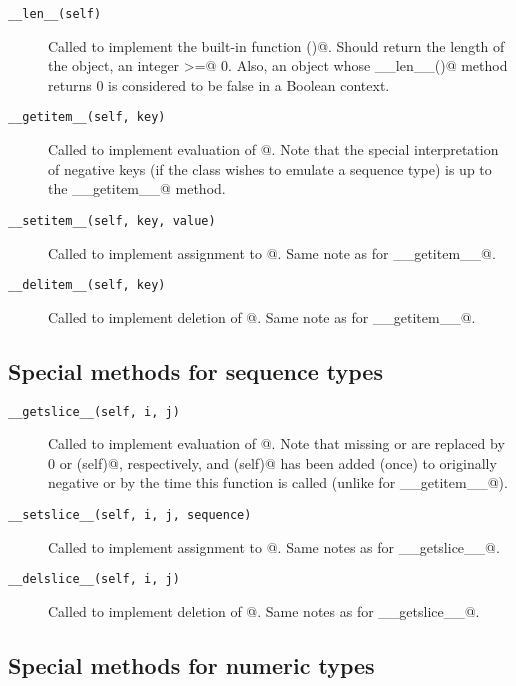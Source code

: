 \begin{description}

\item[\tt __len__(self)]
Called to implement the built-in function \verb@len()@.  Should return
the length of the object, an integer \verb@>=@ 0.  Also, an object
whose \verb@__len__()@ method returns 0 is considered to be false in a
Boolean context.

\item[\tt __getitem__(self, key)]
Called to implement evaluation of \verb@self[key]@.  Note that the
special interpretation of negative keys (if the class wishes to
emulate a sequence type) is up to the \verb@__getitem__@ method.

\item[\tt __setitem__(self, key, value)]
Called to implement assignment to \verb@self[key]@.  Same note as for
\verb@__getitem__@.

\item[\tt __delitem__(self, key)]
Called to implement deletion of \verb@self[key]@.  Same note as for
\verb@__getitem__@.

\end{description}


\subsection{Special methods for sequence types}

\begin{description}

\item[\tt __getslice__(self, i, j)]
Called to implement evaluation of \verb@self[i:j]@.  Note that missing
\verb@i@ or \verb@j@ are replaced by 0 or \verb@len(self)@,
respectively, and \verb@len(self)@ has been added (once) to originally
negative \verb@i@ or \verb@j@ by the time this function is called
(unlike for \verb@__getitem__@).

\item[\tt __setslice__(self, i, j, sequence)]
Called to implement assignment to \verb@self[i:j]@.  Same notes as for
\verb@__getslice__@.

\item[\tt __delslice__(self, i, j)]
Called to implement deletion of \verb@self[i:j]@.  Same notes as for
\verb@__getslice__@.

\end{description}


\subsection{Special methods for numeric types}

